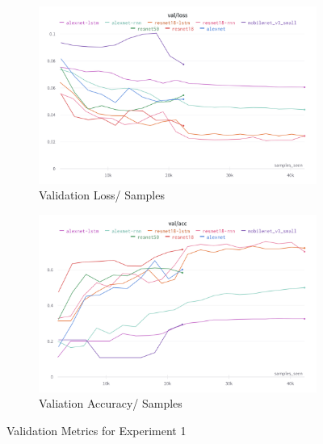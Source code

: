 \documentclass[a4paper]{article}
\begin{document}
  \begin{figure}[ht]
    \centering
    \begin{subfigure}[b]{0.49\linewidth}
      \centering
      \includegraphics[width=\linewidth]{figures/experiment1-val-loss.png}
      \caption{Validation Loss/ Samples}
      \label{fig:experiment1-val-acc}
    \end{subfigure}
    \hfill
    \begin{subfigure}[b]{0.49\linewidth}
      \centering
      \includegraphics[width=\linewidth]{figures/experiment1-val-acc.png}
      \caption{Valiation Accuracy/ Samples}
      \label{fig:experiment1-val-loss}
    \end{subfigure}
    \caption{Validation Metrics for Experiment 1}
    \label{fig:experiment-1-validation}
  \end{figure}
\end{document}
